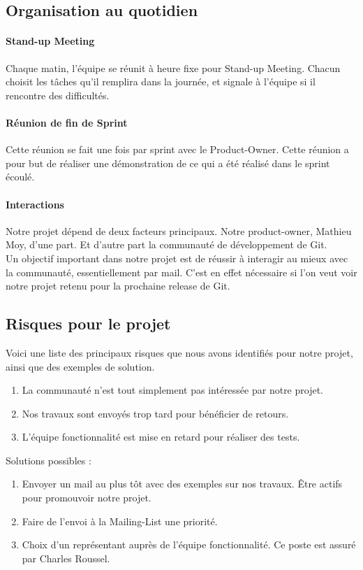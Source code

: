 \documentclass[11pt]{article}
\begin{document}
\subsection{Organisation au quotidien}
\paragraph{Stand-up Meeting}
Chaque matin, l'équipe se réunit à heure fixe pour Stand-up Meeting.
Chacun choisit les tâches qu'il remplira dans la journée, et signale à l'équipe si il rencontre des difficultés. 
\paragraph{Réunion de fin de Sprint}
Cette réunion se fait une fois par sprint avec le Product-Owner. Cette réunion a pour but de réaliser une démonstration de ce qui a été réalisé dans le sprint écoulé.
\paragraph{Interactions}
Notre projet dépend de deux facteurs principaux. Notre product-owner, Mathieu Moy, d'une part. Et d'autre part la communauté de développement de Git.\\
Un objectif important dans notre projet est de réussir à interagir au mieux avec la communauté, essentiellement par mail. C'est en effet nécessaire si l'on veut voir notre projet retenu pour la prochaine release de Git.
\subsection{Risques pour le projet}
Voici une liste des principaux risques que nous avons identifiés pour notre projet, ainsi que des exemples de solution.
\begin{enumerate}
\item La communauté n'est tout simplement pas intéressée par notre projet. 
\item Nos travaux sont envoyés trop tard pour bénéficier de retours.
\item L'équipe fonctionnalité est mise en retard pour réaliser des tests.
\end{enumerate}

Solutions possibles :
\begin{enumerate}
\item Envoyer un mail au plus tôt avec des exemples sur nos travaux. Être actifs pour promouvoir notre projet.
\item Faire de l'envoi à la Mailing-List une priorité.
\item Choix d'un représentant auprès de l'équipe fonctionnalité. Ce poste est assuré par Charles Roussel. 
\end{enumerate}
\end{document}
